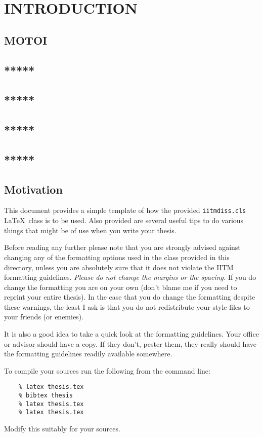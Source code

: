 	\chapter{INTRODUCTION}
	\label{chap:intro}
	
	\section{MOTOI}
	\section{*****}
	\section{*****}
	\section{*****}
	\section{*****}
	\section{Motivation}
	This document provides a simple template of how the provided
	\verb+iitmdiss.cls+ \LaTeX\ class is to be used.  Also provided are
	several useful tips to do various things that might be of use when you
	write your thesis.
	
	Before reading any further please note that you are strongly advised
	against changing any of the formatting options used in the class
	provided in this directory, unless you are absolutely sure that it
	does not violate the IITM formatting guidelines.  \emph{Please do not
		change the margins or the spacing.}  If you do change the formatting
	you are on your own (don't blame me if you need to reprint your entire
	thesis).  In the case that you do change the formatting despite these
	warnings, the least I ask is that you do not redistribute your style
	files to your friends (or enemies).
	
	It is also a good idea to take a quick look at the formatting
	guidelines.  Your office or advisor should have a copy.  If they
	don't, pester them, they really should have the formatting guidelines
	readily available somewhere.
	
	To compile your sources run the following from the command line:
	\begin{verbatim}
	% latex thesis.tex
	% bibtex thesis
	% latex thesis.tex
	% latex thesis.tex
	\end{verbatim}
	Modify this suitably for your sources.
	
